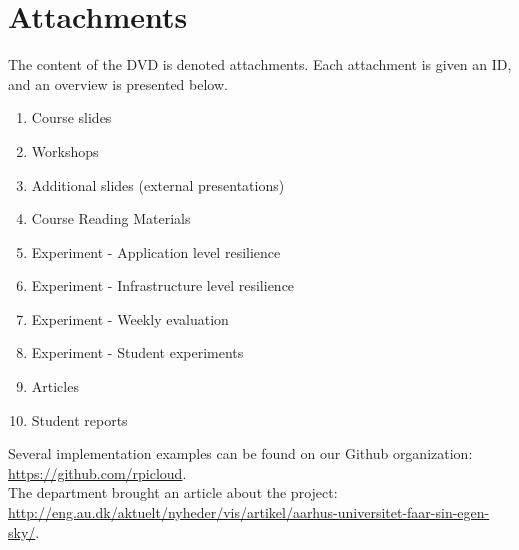 \chapter{Attachments}

The content of the DVD is denoted attachments. Each attachment is given an ID, and an overview is presented below.

\begin{enumerate}
	\item Course slides
	\item Workshops
	\item Additional slides (external presentations)
	\item Course Reading Materials
	\item Experiment - Application level resilience
	\item Experiment - Infrastructure level resilience
	\item Experiment - Weekly evaluation
	\item Experiment - Student experiments
	\item Articles
	\item Student reports
\end{enumerate}


\noindent
Several implementation examples can be found on our Github organization: \url{https://github.com/rpicloud}. \\

\noindent
The department brought an article about the project: \url{http://eng.au.dk/aktuelt/nyheder/vis/artikel/aarhus-universitet-faar-sin-egen-sky/}.